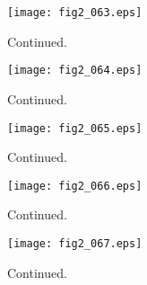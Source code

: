 \documentclass[preprint]{aastex}
\begin{document}
\setcounter{figure}{1}
\begin{figure}[t]
\centering
\texttt{[image: fig2\_063.eps]}
\caption{
Continued. 
}
\label{Fig2}
\end{figure}
\clearpage



\setcounter{figure}{1}
\begin{figure}[t]
\centering
\texttt{[image: fig2\_064.eps]}
\caption{
Continued. 
}
\label{Fig2}
\end{figure}
\clearpage



\setcounter{figure}{1}
\begin{figure}[t]
\centering
\texttt{[image: fig2\_065.eps]}
\caption{
Continued. 
}
\label{Fig2}
\end{figure}
\clearpage



\setcounter{figure}{1}
\begin{figure}[t]
\centering
\texttt{[image: fig2\_066.eps]}
\caption{
Continued. 
}
\label{Fig2}
\end{figure}
\clearpage



\setcounter{figure}{1}
\begin{figure}[t]
\centering
\texttt{[image: fig2\_067.eps]}
\caption{
Continued. 
}
\label{Fig2}
\end{figure}
\clearpage
\end{document}

